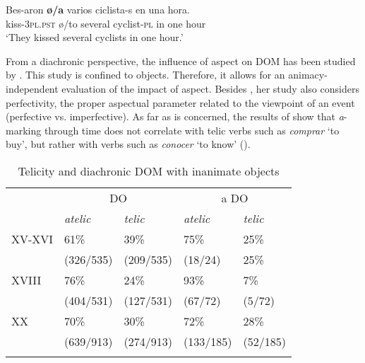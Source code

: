 \documentclass[output=paper]{LSP/langsci}
\begin{document}
\ea \label{08-ga-ex:15}
\gll Bes-aron \textbf{ø/a} varios ciclista-s en una hora.\\
kiss-3\textsc{pl}.\textsc{pst} ø/to several cyclist-\textsc{pl} in one hour\\
\glt ‘They kissed several cyclists in one hour.’
\z

From a diachronic perspective, the influence of aspect on DOM has been studied by \citet{Barraza2008Marcacion}. This study is confined to  objects. Therefore, it allows for an animacy-independent evaluation of the impact of aspect. Besides , her study also considers perfectivity, \ie the proper aspectual parameter related to the viewpoint of an event (perfective vs. imperfective). As far as  is concerned, the results of \citet[343--346]{Barraza2008Marcacion} show that \textit{a}-marking through time does not correlate with telic verbs such as \textit{comprar} ‘to buy’, but rather with  verbs such as \textit{conocer} ‘to know’ (\cf {}).

\begin{table}
\begin{tabularx}{\textwidth}{XXXXX} 
\lsptoprule
& \multicolumn{2}{c}{DO { }{ }{ }{ }{ }{ }{ }{ }{ }} & \multicolumn{2}{c}{a DO { }{ }{ }{ }{ }{ }{ }{ }{ }{ }{ }{ }}\\
& {\itshape atelic} & {\itshape telic} & {\itshape atelic} & {\itshape telic}\\
\midrule
XV-XVI & 61\% & 39\%& 75\% & 25\% \\
 & (326/535) & (209/535) & (18/24) & 25\%\\

XVIII & 76\% & 24\% & 93\% & 7\% \\
& (404/531) & (127/531) & (67/72) & (5/72)\\

XX & 70\% & 30\% & 72\% & 28\% \\
& (639/913) & (274/913) & (133/185) & (52/185)\\
\lspbottomrule
\end{tabularx}
\caption{Telicity and diachronic DOM with inanimate objects \citep[345]{Barraza2008Marcacion}}\label{08-ga-tab:6}
\end{table}
\end{document}

